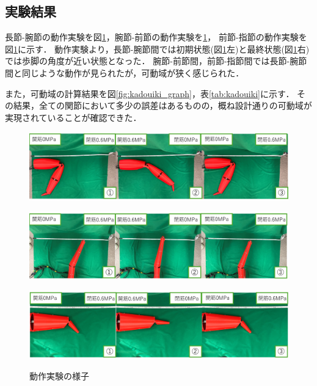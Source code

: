 \subsection{実験結果}
長節-腕節の動作実験を図\ref{fig:dousajikken}，腕節-前節の動作実験を\ref{fig:dousajikken}，
前節-指節の動作実験を図\ref{fig:dousajikken}に示す．
動作実験より，長節-腕節間では初期状態(図\ref{fig:dousajikken}左)と最終状態(図\ref{fig:dousajikken}右)では歩脚の角度が近い状態となった．
腕節-前節間，前節-指節間では長節-腕節間と同じような動作が見られたが，可動域が狭く感じられた．

また，可動域の計算結果を図\ref{fig:kadouiki_graph}，表\ref{tab:kadouiki}に示す．
その結果，全ての関節において多少の誤差はあるものの，概ね設計通りの可動域が実現されていることが確認できた．
\begin{figure}[!ht]
    \begin{minipage}{1\hsize}
      \centering
      \includegraphics[scale=0.4]{image/chousetu-wansetu_edited.png}
      \vspace{-1mm}
      \label{fig:move_1}
    \end{minipage}
    \begin{minipage}{1\hsize}
      \centering
      \vspace{3mm}
      \includegraphics[scale=0.4]{image/wansetu-zensetu_edited.png}
      \label{fig:move_2}
    \end{minipage}
    \begin{minipage}{1\hsize}
      \centering
      \vspace{3mm}
      \includegraphics[scale=0.4]{image/zensetu-sisetu_edited.png}
      \label{fig:move_3}
    \end{minipage}
  \caption{動作実験の様子}
  \label{fig:dousajikken}
\end{figure}
